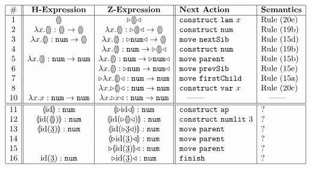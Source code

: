 \documentclass{llncs}
\begin{document}
\begin{figure}[t]
\[
\begin{array}{|c||c|c||l|l|}
\hline
\# & \textbf{H-Expression} & \textbf{Z-Expression} & \textbf{Next Action} & \textbf{Semantics}
\\
\hline
1 &
\hhole{} &
\zwsel{\hhole{}}
&
\aConstruct{\flam{x}} & \refrule{20e}
\\ 2 &
\hlam{x}{\hhole{}} : \tarr{\hhole{}}{\hhole{}} &
\hlam{x}{\hhole{}} : \tarr{\zwsel{\hhole{}}}{\hhole{}}
&
\aConstruct{\fnum{}} & \refrule{19b}
\\ 3 &
\hlam{x}{\hhole{}} : \tarr{\tnum{}}{\hhole{}} &
\hlam{x}{\hhole{}} : \tarr{\zwsel{\tnum{}}}{\hhole{}}
&
\aMove{\dNext{}} & \refrule{15d}
\\ 4 &
&
\hlam{x}{\hhole{}} : \tarr{\tnum}{\zwsel{\hhole{}}}
&
\aConstruct{\fnum{}} & \refrule{19b}
\\ 5 &
\hlam{x}{\hhole{}} : \tarr{\tnum{}}{\tnum{}} &
\hlam{x}{\hhole{}} : \tarr{\tnum{}}{\zwsel{\tnum{}}}
&
\aMove{\dParent{}} & \refrule{15b}
\\ 6 &
&
\hlam{x}{\hhole{}} : \zwsel{\tarr{\tnum{}}{\tnum{}}}
&
\aMove{\dPrev{}} & \refrule{15e}
\\ 7 &
&
\zwsel{\hlam{x}{\hhole{}}} : \tarr{\tnum{}}{\tnum{}}
&
\aMove{\dChild{}} & \refrule{15a}
\\ 8 &
&
\hlam{x}{\zwsel{\hhole{}}} : \tarr{\tnum{}}{\tnum{}}
&
\aConstruct{\fvar{x}} & \refrule{20c}
\\ 10 &
\hlam{x}{{x}} : \tarr{\tnum{}}{\tnum{}}
&
\hlam{x}{\zwsel{{x}}} : \tarr{\tnum{}}{\tnum{}}
&
\quad\textrm{---{}---}
&
\quad\textrm{---{}---}
\\
\hline
\hline
11 &
\hhole{\textrm{id}} : \tnum{} &
\hhole{\zwsel{{\textrm{id}}}} : \tnum{}
&
\aConstruct{\fap{}} & ?
\\
12 &
\hhole{\hap{{{\textrm{id}}}}{{\hhole{}}}} : \tnum{}
&
\hhole{\hap{{{\textrm{id}}}}{\zwsel{\hhole{}}}} : \tnum{}
&
\aConstruct{\fnumlit{3}} & ?
\\
13 &
\hhole{\hap{{{\textrm{id}}}}{{\hnum{3}}}} : \tnum{}
&
\hhole{\hap{{{\textrm{id}}}}{\zwsel{\hnum{3}}}} : \tnum{}
&
\aMove{\dParent{}} & ?
\\
14 &
&
\hhole{\zwsel{\hap{{{\textrm{id}}}}{{\hnum{3}}}}} : \tnum{}
&
\aMove{\dParent{}} & ?
\\
15 &
&
\zwsel{\hhole{{\hap{{{\textrm{id}}}}{{\hnum{3}}}}}} : \tnum{}
&
\aMove{\dParent{}} & ?
\\
16 &
{\hap{{{\textrm{id}}}}{{\hnum{3}}}} : \tnum{}
&
\zwsel{{{\hap{{{\textrm{id}}}}{{\hnum{3}}}}}} : \tnum{}
&
\aFinish & ?
\\
\hline


\end{array}\]
\end{figure}
\end{document}
